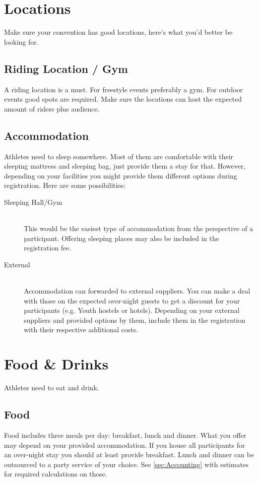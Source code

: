 \documentclass[11pt]{report}
\newcommand{\fullref}[1]{\autoref{#1} \nameref{#1}}
\begin{document}
\section{Locations}

Make sure your convention has good locations, here's what you'd better be 
looking for.

\subsection{Riding Location / Gym}

A riding location is a must. For freestyle events preferably a gym. For outdoor 
events good spots are required. Make sure the locations can host the expected 
amount of riders plus audience.

\subsection{Accommodation}
Athletes need to sleep somewhere. Most of them are comfortable with their 
sleeping mattress and sleeping bag, just provide them a stay for that. However, 
depending on your facilities you might provide them different options during 
registration. Here are some possibilities:

\begin{description}
	\item [Sleeping Hall/Gym] \hfill \\ 
		This would be the easiest type of accommodation from the perspective of a 
		participant. Offering sleeping places may also be included in the 
		registration fee.
	\item [External] \hfill \\
		Accommodation can forwarded to external suppliers. You can make a deal 
		with those on the expected over-night guests to get a discount for your 
		participants (e.g. Youth hostels or hotels). Depending on your external 
		suppliers and provided options by them, include them in the registration 
		with their respective additional costs.
\end{description}

\section{Food \& Drinks}
Athletes need to eat and drink.

\subsection{Food}
Food includes three meals per day: breakfast, lunch and dinner. What you offer 
may depend on your provided accommodation. If you house all participants for an 
over-night stay you should at least provide breakfast. Lunch and dinner can be 
outsourced to a party service of your choice. See \fullref{sec:Accounting}
with estimates for required calculations on those.
\end{document}
